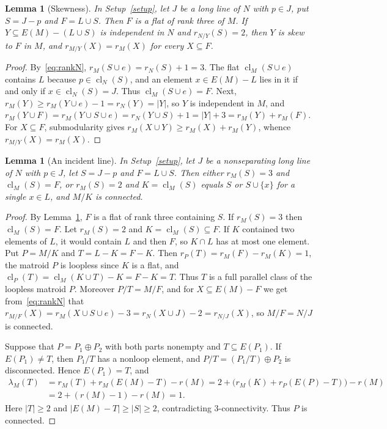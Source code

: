 \documentclass[11pt]{amsart}
\newtheorem{lemma}[theorem]{Lemma}
\theoremstyle{definition}
\theoremstyle{remark}
\numberwithin{equation}{section}
\newcommand{\cl}{\operatorname{cl}}
\newcommand{\lam}{\lambda}
\begin{document}
\begin{lemma}[Skewness]\label{lem:skew}
In Setup~\textup{\ref{setup}}, let $J$ be a long line of $N$ with $p\in J$, put $S=J-p$ and $F=L\cup S$. Then $F$ is a flat of rank three of $M$. If $Y\subseteq E(M)-(L\cup S)$ is independent in $N$ and $r_{N/Y}(S)=2$, then $Y$ is skew to $F$ in $M$, and $r_{M/Y}(X)=r_M(X)$ for every $X\subseteq F$.
\end{lemma}

\begin{proof}
By~\eqref{eq:rankN}, $r_M(S\cup e)=r_N(S)+1=3$. The flat $\cl_M(S\cup e)$ contains $L$ because $p\in\cl_N(S)$, and an element $x\in E(M)-L$ lies in it if and only if $x\in\cl_N(S)=J$. Thus $\cl_M(S\cup e)=F$. Next, $r_M(Y)\ge r_M(Y\cup e)-1=r_N(Y)=|Y|$, so $Y$ is independent in $M$, and $r_M(Y\cup F)=r_M(Y\cup S\cup e)=r_N(Y\cup S)+1=|Y|+3=r_M(Y)+r_M(F)$. For $X\subseteq F$, submodularity gives $r_M(X\cup Y)\ge r_M(X)+r_M(Y)$, whence $r_{M/Y}(X)=r_M(X)$.
\end{proof}

\begin{lemma}[An incident line]\label{lem:liftF}
In Setup~\textup{\ref{setup}}, let $J$ be a nonseparating long line of $N$ with $p\in J$, let $S=J-p$ and $F=L\cup S$. Then either $r_M(S)=3$ and $\cl_M(S)=F$, or $r_M(S)=2$ and $K=\cl_M(S)$ equals $S$ or $S\cup\{x\}$ for a single $x\in L$, and $M/K$ is connected.
\end{lemma}

\begin{proof}
By Lemma~\ref{lem:skew}, $F$ is a flat of rank three containing $S$. If $r_M(S)=3$ then $\cl_M(S)=F$. Let $r_M(S)=2$ and $K=\cl_M(S)\subseteq F$. If $K$ contained two elements of $L$, it would contain $L$ and then $F$, so $K\cap L$ has at most one element. Put $P=M/K$ and $T=L-K=F-K$. Then $r_P(T)=r_M(F)-r_M(K)=1$, the matroid $P$ is loopless since $K$ is a flat, and $\cl_P(T)=\cl_M(K\cup T)-K=F-K=T$. Thus $T$ is a full parallel class of the loopless matroid $P$. Moreover $P/T=M/F$, and for $X\subseteq E(M)-F$ we get from~\eqref{eq:rankN} that $r_{M/F}(X)=r_M(X\cup S\cup e)-3=r_N(X\cup J)-2=r_{N/J}(X)$, so $M/F=N/J$ is connected.

Suppose that $P=P_1\oplus P_2$ with both parts nonempty and $T\subseteq E(P_1)$. If $E(P_1)\ne T$, then $P_1/T$ has a nonloop element, and $P/T=(P_1/T)\oplus P_2$ is disconnected. Hence $E(P_1)=T$, and
\begin{align*}
\lam_M(T)&=r_M(T)+r_M(E(M)-T)-r(M)=2+\big(r_M(K)+r_P(E(P)-T)\big)-r(M)\\
&=2+(r(M)-1)-r(M)=1.
\end{align*}
Here $|T|\ge2$ and $|E(M)-T|\ge|S|\ge2$, contradicting $3$-connectivity. Thus $P$ is connected.
\end{proof}
\end{document}
